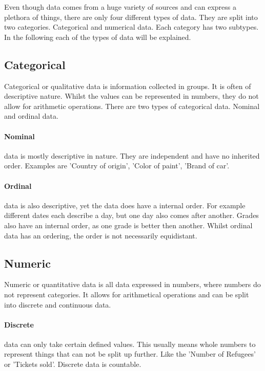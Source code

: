 Even though data comes from a huge variety of sources and can express a plethora of things, there are only four different types of data. They are split into two categories. Categorical and numerical data. Each category has two subtypes. In the following each of the types of data will be explained.

\subsection{Categorical}

Categorical or qualitative data is information collected in groups. It is often of descriptive nature. Whilst the values can be represented in numbers, they do not allow for arithmetic operations.
There are two types of categorical data. Nominal and ordinal data.

\paragraph{Nominal}
data is mostly descriptive in nature. They are independent and have no inherited order. Examples are 'Country of origin', 'Color of paint', 'Brand of car'.

\paragraph{Ordinal}
data is also descriptive, yet the data does have a internal order. For example different dates each describe a day, but one day also comes after another. Grades also have an internal order, as one grade is better then another. Whilst ordinal data has an ordering, the order is not necessarily equidistant.

\subsection{Numeric}

Numeric or quantitative data is all data expressed in numbers, where numbers do not represent categories. It allows for arithmetical operations and can be split into discrete and continuous data.

\paragraph{Discrete}
data can only take certain defined values. This usually means whole numbers to represent things that can not be split up further. Like the 'Number of Refugees' or 'Tickets sold'. Discrete data is countable.


